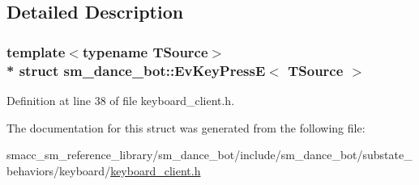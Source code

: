 \subsection{Detailed Description}
\subsubsection*{template$<$typename T\+Source$>$\\*
struct sm\+\_\+dance\+\_\+bot\+::\+Ev\+Key\+Press\+E$<$ T\+Source $>$}



Definition at line 38 of file keyboard\+\_\+client.\+h.



The documentation for this struct was generated from the following file\+:\begin{DoxyCompactItemize}
\item 
smacc\+\_\+sm\+\_\+reference\+\_\+library/sm\+\_\+dance\+\_\+bot/include/sm\+\_\+dance\+\_\+bot/substate\+\_\+behaviors/keyboard/\hyperlink{keyboard__client_8h}{keyboard\+\_\+client.\+h}\end{DoxyCompactItemize}
